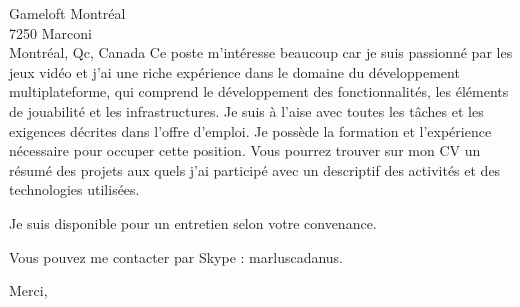 \documentclass[11pt]{letter} %
\begin{document}
\begin{letter}{Gameloft Montréal \\
7250 Marconi \\
Montréal, Qc, Canada}
Ce poste m'intéresse beaucoup car je suis passionné par les jeux vidéo et j'ai une riche expérience dans le domaine du développement multiplateforme, qui comprend le développement des fonctionnalités, les éléments de jouabilité et les infrastructures. Je suis à l'aise avec toutes les tâches et les exigences décrites dans l'offre d'emploi. Je possède la formation et l'expérience nécessaire pour occuper cette position. Vous pourrez trouver sur mon CV un résumé des projets aux quels j'ai participé avec un descriptif des activités et des technologies utilisées.

Je suis disponible pour un entretien selon votre convenance.

Vous pouvez me contacter par Skype : marluscadanus.

\closing{Merci, }


\end{letter}
\end{document}
